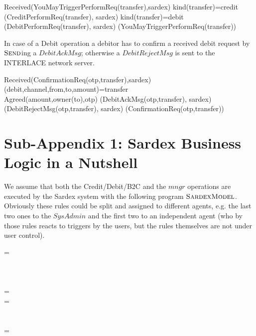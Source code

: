 \begin{asm}
\IF Received(YouMayTriggerPerformReq(transfer),\FROM sardex) \THEN \+
\IF kind(transfer)=credit \THEN \+
(CreditPerformReq(transfer), \TO  sardex) \-
\IF kind(transfer)=debit \THEN \+
(DebitPerformReq(transfer), \TO  sardex)  \-
(YouMayTriggerPerformReq(transfer))
\end{asm}

In case of a Debit operation a debitor has to confirm a received debit request by $\hbox{\sc Send}$ing a $DebitAckMsg$; otherwise a $DebitRejectMsg$ is sent to the INTERLACE network server.
\begin{asm}
\IF Received(ConfirmationReq(otp,transfer),\FROM sardex) \THEN \+
\LET (debit,channel,from,to,amount)=transfer \\
\IF Agreed(amount,owner(to),otp) \THEN\+
(DebitAckMsg(otp,transfer), \TO sardex) \-
\ELSE ~ (DebitRejectMsg(otp,transfer), \TO sardex)\-
(ConfirmationReq(otp,transfer))
\end{asm}


\section{Sub-Appendix 1: Sardex Business Logic in a Nutshell}
\label{sect:appendixModel}

We assume that both the Credit/Debit/B2C and the $mngr$ operations are executed by the Sardex system with the following program $\hbox{\sc SardexModel}$. Obviously these rules could be split and assigned to different agents, e.g. the last two ones to the $SysAdmin$ and the first two to an independent agent (who by those rules reacts to triggers by the users, but the rules themselves are not under user control).

\begin{asm}
 =\+
  \\
  \\
  \\
  \\
   \-
\WHERE \+
  =\+
      \\
      \-
  =\+
      \\
      \\
     \\
     \-
   =\+    
     	\\
     	\\
 \end{asm}
 
